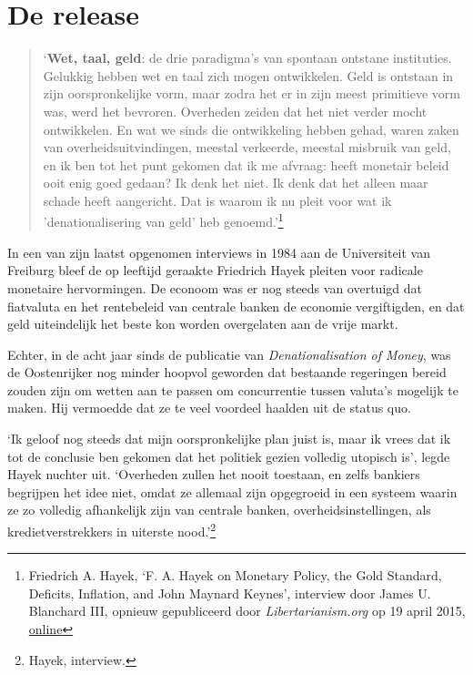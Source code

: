\documentclass[smalldemyvopaper,11pt,twoside,onecolumn,openright,extrafontsizes,hidelinks]{memoir}
\begin{document}
\chapter{De release}\label{de-release}

\begin{quote}
`\textbf{Wet, taal, geld}: de drie paradigma's van spontaan ontstane
instituties. Gelukkig hebben wet en taal zich mogen ontwikkelen. Geld is
ontstaan in zijn oorspronkelijke vorm, maar zodra het er in zijn meest
primitieve vorm was, werd het bevroren. Overheden zeiden dat het niet
verder mocht ontwikkelen. En wat we sinds die ontwikkeling hebben gehad,
waren zaken van overheidsuitvindingen, meestal verkeerde, meestal
misbruik van geld, en ik ben tot het punt gekomen dat ik me afvraag:
heeft monetair beleid ooit enig goed gedaan? Ik denk het niet. Ik denk
dat het alleen maar schade heeft aangericht. Dat is waarom ik nu pleit
voor wat ik 'denationalisering van geld' heb genoemd.'\footnote{Friedrich
  A. Hayek, `F. A. Hayek on Monetary Policy, the Gold Standard,
  Deficits, Inflation, and John Maynard Keynes', interview door James U.
  Blanchard III, opnieuw gepubliceerd door \emph{Libertarianism.org} op
  19 april 2015,
  \href{https://www.youtube.com/watch?v=EYhEDxFwFRU}{online}}
\end{quote}

In een van zijn laatst opgenomen interviews in 1984 aan de Universiteit
van Freiburg bleef de op leeftijd geraakte Friedrich Hayek pleiten voor
radicale monetaire hervormingen. De econoom was er nog steeds van
overtuigd dat fiatvaluta en het rentebeleid van centrale banken de
economie vergiftigden, en dat geld uiteindelijk het beste kon worden
overgelaten aan de vrije markt.

Echter, in de acht jaar sinds de publicatie van \emph{Denationalisation
of Money}, was de Oostenrijker nog minder hoopvol geworden dat bestaande
regeringen bereid zouden zijn om wetten aan te passen om concurrentie
tussen valuta's mogelijk te maken. Hij vermoedde dat ze te veel voordeel
haalden uit de status quo.

`Ik geloof nog steeds dat mijn oorspronkelijke plan juist is, maar ik
vrees dat ik tot de conclusie ben gekomen dat het politiek gezien
volledig utopisch is', legde Hayek nuchter uit. `Overheden zullen het
nooit toestaan, en zelfs bankiers begrijpen het idee niet, omdat ze
allemaal zijn opgegroeid in een systeem waarin ze zo volledig
afhankelijk zijn van centrale banken, overheidsinstellingen, als
kredietverstrekkers in uiterste nood.'\footnote{Hayek, interview.}
\end{document}

